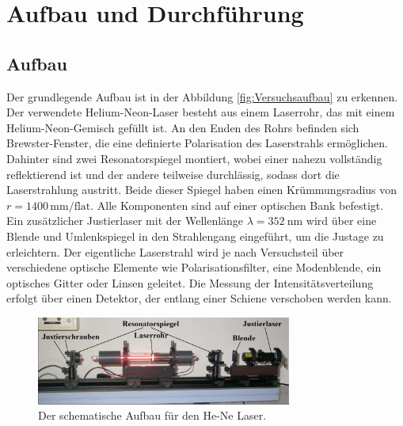 \section{Aufbau und Durchführung}
\label{sec:AufbauUndDurchführung}
\subsection{Aufbau}
\label{sec:Aufbau}
Der grundlegende Aufbau ist in der Abbildung \autoref{fig:Versuchsaufbau} zu erkennen.
Der verwendete Helium-Neon-Laser besteht aus einem Laserrohr, das mit einem Helium-Neon-Gemisch gefüllt ist. An den Enden des Rohrs befinden sich Brewster-Fenster, die eine definierte Polarisation des Laserstrahls ermöglichen. Dahinter sind zwei Resonatorspiegel montiert, wobei einer nahezu vollständig reflektierend ist und der andere teilweise durchlässig, sodass dort die Laserstrahlung austritt. Beide dieser Spiegel haben einen Krümmungsradius von $r = 1400\,\si{\milli\meter\per{\text{flat}}}$. Alle Komponenten sind auf einer optischen Bank befestigt.\\
Ein zusätzlicher Justierlaser mit der Wellenlänge $\lambda = \SI{352}{\nano\meter}$ wird über eine Blende und Umlenkspiegel in den Strahlengang eingeführt, um die Justage zu erleichtern. Der eigentliche Laserstrahl wird je nach Versuchsteil über verschiedene optische Elemente wie Polarisationsfilter, eine Modenblende, ein optisches Gitter oder Linsen geleitet. Die Messung der Intensitätsverteilung erfolgt über einen Detektor, der entlang einer Schiene verschoben werden kann. \cite{anleitungV61}
\begin{figure}
    \centering
    \includegraphics[width=0.75\textwidth]{Bilder/Aufbau.png}
    \caption{Der schematische Aufbau für den He-Ne Laser. \cite{anleitungV61}}
    \label{fig:Versuchsaufbau}
  \end{figure}

